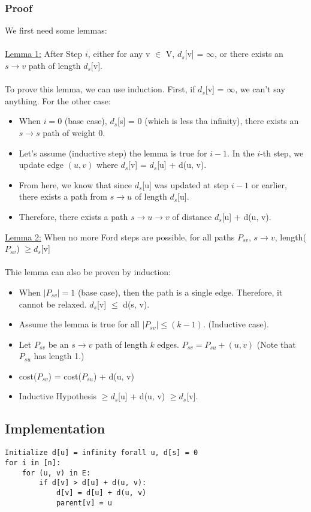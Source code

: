 \documentclass[10pt]{article}
\begin{document}
\subsubsection*{Proof}
We first need some lemmas:\\\\
\underline{Lemma 1:}  After Step $i$, either for any v $\in$ V, $d_s$[v] = $\infty$, or there exists an $s \rightarrow v$ path of length $d_s$[v].\\\\
To prove this lemma, we can use induction.  First, if $d_s$[v] = $\infty$, we can't say anything.  For the other case:  
\begin{itemize}
    \item When $i = 0$ (base case), $d_s$[s] = 0 (which is less tha infinity), there exists an $s \rightarrow s$ path of weight 0.  
    \item Let's assume (inductive step) the lemma is true for $i - 1$.  In the $i$-th step, we update edge $(u, v)$ where $d_s$[v] = $d_s$[u] + d(u, v).
	\item From here, we know that since $d_s$[u] was updated at step $i - 1$ or earlier, there exists a path from $s \rightarrow u$ of length $d_s$[u].
	\item Therefore, there exists a path $s \rightarrow u \rightarrow v$ of distance $d_s$[u] + d(u, v).
\end{itemize}
\underline{Lemma 2:}  When no more Ford steps are possible, for all paths $P_{sv}$, $s \rightarrow v$, length($P_{sv}$) $\geq d_s$[v]\\\\
Thie lemma can also be proven by induction:
\begin{itemize}
	\item When $|P_{sv}| = 1$ (base case), then the path is a single edge.  Therefore, it cannot be relaxed.  $d_s$[v] $\leq$ d(s, v).
	\item Assume the lemma is true for all $|P_{sv}| \leq (k - 1)$.  (Inductive case).  
    \item Let $P_{sv}$ be an $s \rightarrow v$ path of length $k$ edges.  $P_{sv} = P_{su} + (u, v)$  (Note that $P_{su}$ has length 1.)
    \item cost($P_{sv}$) = cost($P_{su}$) + d(u, v)
    \item Inductive Hypothesis $\geq d_s$[u] + d(u, v) $\geq d_s$[v].
\end{itemize}

\subsection*{Implementation}
\begin{verbatim}
Initialize d[u] = infinity forall u, d[s] = 0
for i in [n]:
    for (u, v) in E:
        if d[v] > d[u] + d(u, v):
            d[v] = d[u] + d(u, v)
            parent[v] = u
\end{verbatim}
\end{document}
